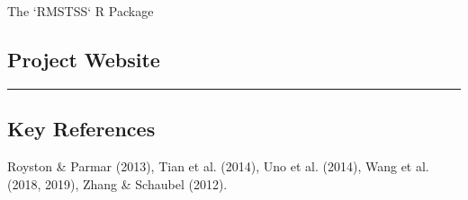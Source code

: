 \documentclass[a0,landscape]{a0poster}
\begin{document}
\begin{minipage}[t][\dimexpr\textheight-1cm\relax][t]{0.32\linewidth}
\begin{posterbox}{The `RMSTSS` R Package}
    \vfill %
    
    \subsection*{\huge Project Website}
    \begin{center}
    \end{center}

    \vspace{0.5cm}\hrule\vspace{0.5cm}
    
    \subsection*{\huge Key References}
    \small
    Royston \& Parmar (2013), Tian et al. (2014), Uno et al. (2014), Wang et al. (2018, 2019), Zhang \& Schaubel (2012).
\end{posterbox}

\end{minipage}
\end{document}
